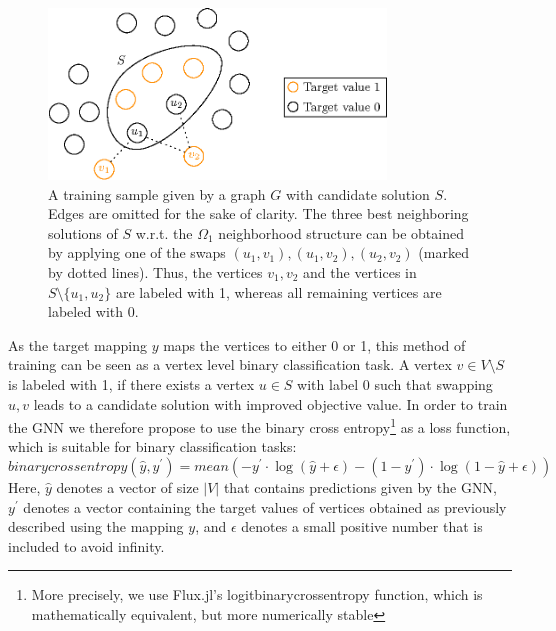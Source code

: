 \documentclass[draft,final]{vutinfth} %
\begin{document}
\begin{figure}
    \centering
    \includegraphics[width=0.8\textwidth]{graphics/target_values.eps}
    \caption[]{A training sample given by a graph $G$ with candidate solution $S$. Edges are omitted for the sake of clarity. The three best neighboring solutions of $S$ w.r.t. the $\Omega_1$ neighborhood structure can be obtained by applying one of the swaps $(u_1, v_1), (u_1, v_2), (u_2, v_2)$ (marked by dotted lines). Thus, the vertices $v_1, v_2$ and the vertices in $S \setminus \{u_1, u_2\}$ are labeled with 1, whereas all remaining vertices are labeled with 0. }
    \label{fig:target-values}
\end{figure}

As the target mapping $y$ maps the vertices to either 0 or 1, this method of training can be seen as a vertex level binary classification task. A vertex $v \in V \setminus S$ is labeled with 1, if there exists a vertex $u \in S$ with label 0 such that swapping $u, v$ leads to a candidate solution with improved objective value. 
In order to train the GNN we therefore propose to use the binary cross entropy\footnote{More precisely, we use Flux.jl's logitbinarycrossentropy function, which is mathematically equivalent, but more numerically stable} as a loss function, which is suitable for binary classification tasks:
\[
    \mathit{binarycrossentropy}(\hat{y}, y^\prime) = \mathit{mean}(-y^\prime \cdot \log(\hat{y} + \epsilon) - (1 - y^\prime) \cdot \log(1 - \hat{y} + \epsilon))    
\]
Here, $\hat{y}$ denotes a vector of size $|V|$ that contains predictions given by the GNN, $y^\prime$ denotes a vector containing the target values of vertices obtained as previously described using the mapping $y$, and $\epsilon$ denotes a small positive number that is included to avoid infinity. 
\end{document}
